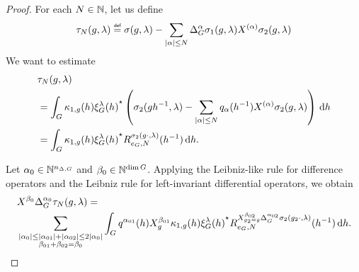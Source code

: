 \begin{proof}
    For each $N \in \mathbb{N}$,
    let us define
    \begin{align*}
        \tau_N(g, \lambda) \defeq
        \sigma(g, \lambda) - \sum_{\abs \alpha \leq N} \DifferenceOperatorOrder \alpha \sigma_1(g, \lambda) \TaylorLeftDifferentialOperator \alpha \sigma_2(g, \lambda)
    \end{align*}
    We want to estimate
    \begin{align}
        &\tau_N(g, \lambda) \notag\\
        &= \int_G \kappa_{1, g}(h) {\xi^{\lambda}_{G}(h)}^\star
        \left(\sigma_2(g h^{-1}, \lambda) - \sum_{\left|{\alpha}\right| \leq N} q_\alpha(h^{-1}) X^{(\alpha)} \sigma_2(g, \lambda)\right) \,\mathrm{d} h \notag\\
        &= \int_G \kappa_{1, g}(h) {\xi^{\lambda}_{G}(h)}^\star R^{\sigma_2(g \cdot, \lambda)}_{e_G, N} (h^{-1}) \,\mathrm{d} h.
        \label{eq:remainder_of_composition_formula}
    \end{align}

    Let $\alpha_0 \in \mathbb{N}^{n_{\Delta, G}}$ and $\beta_0 \in \mathbb{N}^{\dim G}$.
    Applying the Leibniz-like rule for difference operators
    and the Leibniz rule for left-invariant differential operators,
    we obtain
    \begin{align*}
        &\LeftDifferentialOperator {\beta_0} \DifferenceOperatorOrder {\alpha_0} \tau_N(g, \lambda) =\\
        &\sum_{%
            \substack{%
                \abs{\alpha_0} \leq \abs{\alpha_{01}} + \abs{\alpha_{02}} \leq 2 \abs{\alpha_0}\\
                \beta_{01} + \beta_{02} = \beta_0
            }
        }
        \int_\Group q^{\alpha_{01}}(h) \LeftDifferentialOperator [g] {\beta_{01}} \kappa_{1, g}(h) \adj{\Rep \lambda(h)}
        \TaylorRemainder {\LeftDifferentialOperator [g_2 = g] {\beta_{02}} \DifferenceOperatorOrder {\alpha_{02}} \sigma_2(g_2 \dummy, \lambda)} {e_\Group} N (h^{-1}) \dd h.
    \end{align*}


\end{proof}
